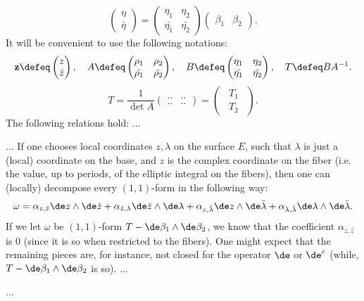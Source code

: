 \[
\begin{pmatrix}
\eta \\ \bar{\eta}
\end{pmatrix}
=
\begin{pmatrix}
\eta_1 & \eta_2 \\
\bar{\eta_1} & \bar{\eta_2}
\end{pmatrix}
\begin{pmatrix}
\beta_1 & \beta_2
\end{pmatrix}.
\]
It will be convenient to use the following notations:
\begin{equation*}
\mathbf{z}\defeq \begin{pmatrix}
z \\ \bar{z}
\end{pmatrix},
\quad
	A\defeq \begin{pmatrix}
\rho_1 & \rho_2 \\
\bar{\rho_1} & \bar{\rho_2}
\end{pmatrix}, 
\quad
	 B\defeq \begin{pmatrix}
\eta_1 & \eta_2 \\
\bar{\eta_1} & \bar{\eta_2}
\end{pmatrix},
\quad
T\defeq BA^{-1}.
\end{equation*}
\begin{equation*}
	T=\frac{1}{\det A}\begin{pmatrix}
	.. & .. \\ .. & ..
	\end{pmatrix}=\begin{pmatrix}
	\ \ T_1 \ \ \\ \ \ T_2 \ \
	\end{pmatrix}.
\end{equation*}
The following relations hold:
...



...
If one chooses local coordinates $z, \lambda$ on the surface $E$, such that $\lambda$ is just a (local) coordinate on the base, and $z$ is the complex coordinate on the fiber (i.e. the value, up to periods, of the elliptic integral on the fibers), then one can (locally) decompose every $(1,1)$-form in the following way:
\[
\omega=\alpha_{z,\bar{z}}\de z \wedge \de \bar{z} +\alpha_{\bar{z},\lambda}\de \bar{z} \wedge \de \lambda+\alpha_{z,\bar{\lambda}}\de z \wedge \de \bar{\lambda}+\alpha_{\lambda,\bar{\lambda}}\de \lambda \wedge \de \bar{\lambda}.
\]
If we let $\omega$ be $(1,1)$-form $T- \de \beta_1 \wedge \de \beta_2$, we know that the coefficient $\alpha_{z,\bar{z}}$ is $0$ (since it is so when restricted to the fibers). One might expect that the remaining pieces are, for instance, not closed for the operator $\de$ or $\de^c$ (while, $T- \de \beta_1 \wedge \de \beta_2$ is so).
...

...
